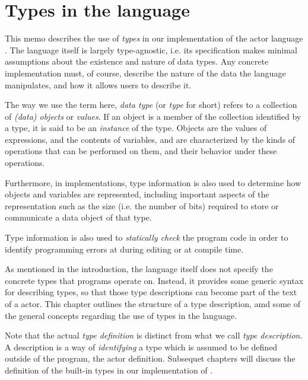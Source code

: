 
\chapter{Types in the \Cal language}\label{chap:CalTypes}

This memo describes the use of {\em types} in our implementation of
the \Cal actor language \cite{CLR1}. The \Cal language itself is
largely type-agnostic, i.e. its specification makes minimal
assumptions about the existence and nature of data types. Any concrete
implementation must, of course, describe the nature of the data the
language manipulates, and how it allows users to describe it.

The way we use the term here, {\em data type} (or {\em type} for short) refers to a
collection of {\em (data) objects} or {\em values}.  If an object is a
member of the collection identified by a type, it is said to be an
{\em instance} of the type. Objects are the values of expressions, and
the contents of variables, and are characterized by the kinds of
operations that can be performed on them, and their behavior under
these operations.

Furthermore, in implementations, type information is also used to
determine how objects and variables are represented, including
important aspects of the representation such as the size (i.e. the
number of bits) required to store or communicate a data object of that
type.

Type information is also used to {\em statically check} the program
code in order to identify programming errors at during editing or at
compile time.



As mentioned in the introduction, the \Cal language itself does not
specify the concrete types that \Cal programs operate on. Instead, it
provides some generic syntax for describing types, so that those type
descriptions can become part of the text of a \Cal actor. This chapter
outlines the structure of a type description, amd some of the general
concepts regarding the use of types in the language.

Note that the actual {\em type definition} is distinct from what we
call {\em type description}. A description is a way of {\em
  identifying} a type which is assumed to be defined outside of the
program, the actor definition. Subsequet chapters will discuss the
definition of the built-in types in our implementation of \Cal.


